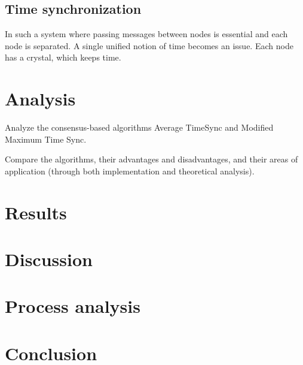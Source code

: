 \documentclass[a4paper,12pt]{article}
\begin{document}



\subsection{Time synchronization}



In such a system where passing messages between nodes is essential and each node is separated. A single unified notion of time becomes an issue. Each node has a crystal, which keeps time. 

 

    

\section{Analysis}%

Analyze the consensus-based algorithms Average TimeSync and Modified Maximum Time Sync. 

Compare the algorithms, their advantages and disadvantages, and their areas of application (through both implementation and theoretical analysis).

\section{Results}


\section{Discussion}

\section{Process analysis}%

\section{Conclusion}



\nocite{*} %
\printbibliography
\end{document}
